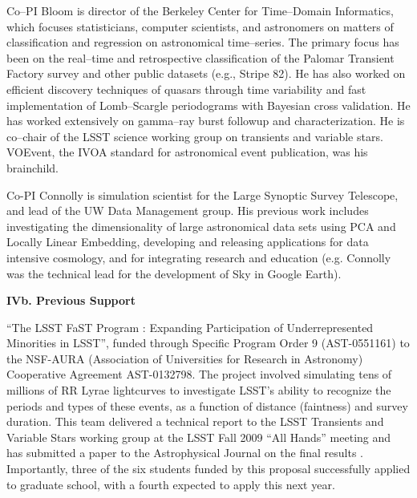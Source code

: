  \smallskip

Co--PI Bloom is director of the Berkeley Center for Time--Domain Informatics,
which focuses statisticians, computer scientists, and astronomers on matters of
classification and regression on astronomical time--series.  The primary focus
has been on the real--time and retrospective classification of the Palomar
Transient Factory survey and other public datasets (e.g., Stripe 82). He has
also worked on efficient discovery techniques of quasars through time
variability and fast implementation of Lomb--Scargle periodograms with Bayesian
cross validation. He has worked extensively on gamma--ray burst followup and
characterization. He is co--chair of the LSST science working group on
transients and variable stars. VOEvent, the IVOA standard for astronomical event
publication, was his brainchild.


 \smallskip

Co-PI Connolly is simulation scientist for the Large Synoptic Survey Telescope,
and lead of the UW Data Management group.  His previous work includes
investigating the dimensionality of large astronomical data sets using PCA and
Locally Linear Embedding, developing and releasing applications for data
intensive cosmology, and for integrating research and education (e.g. Connolly
was the technical lead for the development of Sky in Google Earth).

\bigskip \centerline{\bf IVb. Previous Support} \smallskip

 \smallskip

``The LSST FaST Program : Expanding Participation of Underrepresented Minorities
in LSST'', funded through Specific Program Order 9 (AST-0551161) to the NSF-AURA
(Association of Universities for Research in Astronomy) Cooperative Agreement
AST-0132798.  The project involved simulating tens of millions of RR Lyrae
lightcurves to investigate LSST's ability to recognize the periods and types of
these events, as a function of distance (faintness) and survey duration.  This
team delivered a technical report to the LSST Transients and Variable Stars
working group at the LSST Fall 2009 ``All Hands'' meeting and has submitted a
paper to the Astrophysical Journal on the final results \citep{RRLyrae}.
Importantly, three of the six students funded by this proposal successfully
applied to graduate school, with a fourth expected to apply this next year.

